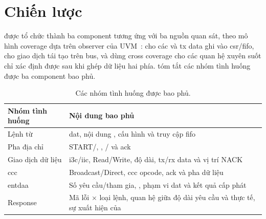 \section{Chiến lược \FunctionalCoverage{}}
\label{sec:ver-cov}

\FunctionalCoverage{} được tổ chức thành ba component tương ứng với ba nguồn quan sát, theo mô hình coverage dựa trên observer của UVM~\cite{uvm12_ug}:
\RegisterCoverage{} cho các \CommandDescriptor{} và \gls{tx} data \Host{} ghi vào \gls{csr}/\gls{fifo}, \IThreeCCoverage{} cho
giao dịch tái tạo trên bus, và \CorrelatedCoverage{} dùng cross coverage cho các quan hệ
xuyên suốt chỉ xác định được sau khi \Scoreboard{} ghép dữ liệu hai phía.
 tóm tắt các nhóm tình huống được ba component bao phủ.

\begin{table}[!htbp]
	\centering
	\caption{Các nhóm tình huống được \FunctionalCoverage{} bao phủ.}
	\label{tab:cov-aspect}
	\begin{tabular}{L{3.8cm} L{10.7cm}}
		\toprule
		\textbf{Nhóm tình huống}                & \textbf{Nội dung bao phủ}                                                                                                             \\
		\midrule
		Lệnh từ \Host{}                         & \gls{dat}, nội dung \CommandDescriptor{}, cấu hình \Host{} và truy cập \gls{fifo}                                                     \\
		Pha địa chỉ                             & START/\RepeatedSTART{}, \IThreeCBroadcastAddress{}, \StaticAddress{}/\DynamicAddress{} và \gls{ack}                                   \\
		Giao dịch dữ liệu                       & \gls{i3c}/\gls{iic}, Read/Write, độ dài, \gls{tx}/\gls{rx} data và vị trí NACK                                                        \\
		\gls{ccc}                               & Broadcast/Direct, \gls{ccc} opcode, \gls{ack} và pha dữ liệu                                                                          \\
		\gls{entdaa}                            & Số \Target{} yêu cầu/tham gia, \DynamicAddress{}, phạm vi \gls{dat} và kết quả cấp phát                                               \\
		Response                                & Mã lỗi $\times$ loại lệnh, quan hệ giữa độ dài yêu cầu và thực tế, sự xuất hiện của \ResponseDescriptor{}                             \\

\end{tabular}
\end{table}
